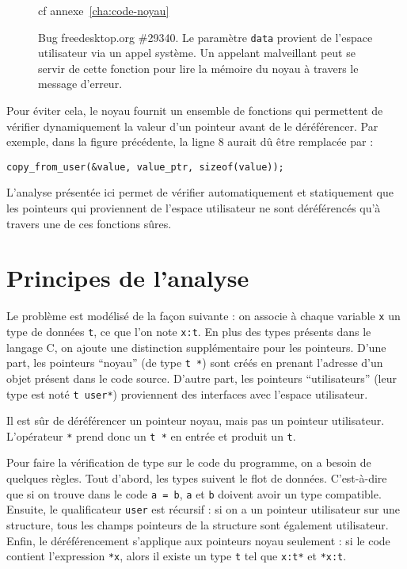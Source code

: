 
\begin{figure}
  cf annexe~\ref{cha:code-noyau}

  \caption[Bug freedesktop.org \#29340]{Bug freedesktop.org \#29340. Le
  paramètre \texttt{data} provient de l'espace utilisateur via un appel système.
  Un appelant malveillant peut se servir de cette fonction pour lire la mémoire
  du noyau à travers le message d'erreur.}

  \label{fig:radeon-bug}
\end{figure}

Pour éviter cela, le noyau fournit un ensemble de fonctions qui permettent de
vérifier dynamiquement la valeur d'un pointeur avant de le déréférencer. Par
exemple, dans la figure précédente, la ligne 8 aurait dû être remplacée par :

\begin{Verbatim}
copy_from_user(&value, value_ptr, sizeof(value));
\end{Verbatim}

L'analyse présentée ici permet de vérifier automatiquement et statiquement que
les pointeurs qui proviennent de l'espace utilisateur ne sont déréférencés qu'à
travers une de ces fonctions sûres.

\section{Principes de l'analyse}

Le problème est modélisé de la façon suivante : on associe à chaque variable
\texttt{x} un type de données \texttt{t}, ce que l'on note \texttt{x:t}. En
plus des types présents dans le langage C, on ajoute une distinction
supplémentaire pour les pointeurs. D'une part, les pointeurs ``noyau'' (de type
\texttt{t~*}) sont créés en prenant l'adresse d'un objet présent dans le code
source. D'autre part, les pointeurs ``utilisateurs'' (leur type est noté
\texttt{t user*}) proviennent des interfaces avec l'espace utilisateur.

Il est sûr de déréférencer un pointeur noyau, mais pas un pointeur
utilisateur. L'opérateur \texttt{*} prend donc un \texttt{t *} en entrée
et produit un \texttt{t}.

Pour faire la vérification de type sur le code du programme, on a besoin de
quelques règles. Tout d'abord, les types suivent le flot de données.
C'est-à-dire que si on trouve dans le code \texttt{a = b}, \texttt{a} et
\texttt{b} doivent avoir un type compatible. Ensuite, le qualificateur
\texttt{user} est récursif : si on a un pointeur utilisateur sur une structure,
tous les champs pointeurs de la structure sont également utilisateur. Enfin, le
déréférencement s'applique aux pointeurs noyau seulement : si le code contient
l'expression \texttt{*x}, alors il existe un type \texttt{t} tel que
\texttt{x:t*} et \texttt{*x:t}.

